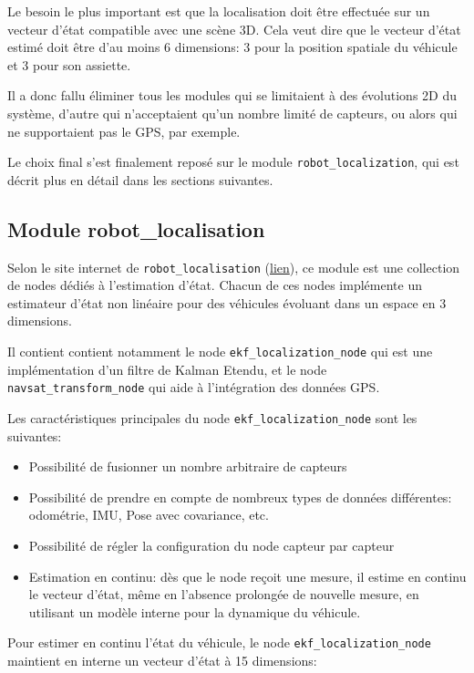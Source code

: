 \documentclass[12pt,a4paper]{report}
\begin{document}
	\para Le besoin le plus important est que la localisation doit être effectuée sur un vecteur d'état compatible avec une scène 3D. Cela veut dire que le vecteur d'état estimé doit être d'au moins 6 dimensions: 3 pour la position spatiale du véhicule et 3 pour son assiette.
	
	\para Il a donc fallu éliminer tous les modules qui se limitaient à des évolutions 2D du système, d'autre qui n'acceptaient qu'un nombre limité de capteurs, ou alors qui ne supportaient pas le GPS, par exemple.
	
	\para Le choix final s'est finalement reposé sur le module \verb|robot_localization|, qui est décrit plus en détail dans les sections suivantes.
	
	\subsection{Module robot\_localisation}
	Selon le site internet de \verb|robot_localisation| (\href{http://docs.ros.org/melodic/api/robot_localization/html/index.html}{lien}), ce module est une collection de nodes dédiés à l'estimation d'état. Chacun de ces nodes implémente un estimateur d'état non linéaire pour des véhicules évoluant dans un espace en 3 dimensions.
	
	\para Il contient contient notamment le node \verb|ekf_localization_node| qui est une implémentation d'un filtre de Kalman Etendu, et le node \verb|navsat_transform_node| qui aide à l'intégration des données GPS.
	
	\para Les caractéristiques principales du node \verb|ekf_localization_node| sont les suivantes:
	\begin{itemize}
		\item Possibilité de fusionner un nombre arbitraire de capteurs
		\item Possibilité de prendre en compte de nombreux types de données différentes: odométrie, IMU, Pose avec covariance, etc.
		\item Possibilité de régler la configuration du node capteur par capteur
		\item Estimation en continu: dès que le node reçoit une mesure, il estime en continu le vecteur d'état, même en l'absence prolongée de nouvelle mesure, en utilisant un modèle interne pour la dynamique du véhicule.
	\end{itemize}

	\para Pour estimer en continu l'état du véhicule, le node \verb|ekf_localization_node| maintient en interne un vecteur d'état à 15 dimensions:
	
\end{document}

